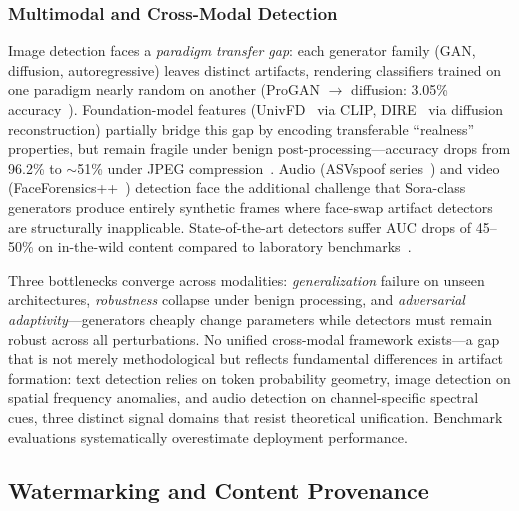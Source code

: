 \subsubsection{Multimodal and Cross-Modal Detection}
\label{sec:detect-multimodal}

Image detection faces a \emph{paradigm transfer gap}: each generator family (GAN, diffusion, autoregressive) leaves distinct artifacts, rendering classifiers trained on one paradigm nearly random on another (ProGAN $\to$ diffusion: 3.05\% accuracy~\cite{ojha2023univfd}). Foundation-model features (UnivFD~\cite{ojha2023univfd} via CLIP, DIRE~\cite{wang2023dire} via diffusion reconstruction) partially bridge this gap by encoding transferable ``realness'' properties, but remain fragile under benign post-processing---accuracy drops from 96.2\% to $\sim$51\% under JPEG compression~\cite{zhu2023genimage}. Audio (ASVspoof series~\cite{asvspoof2019,asvspoof2021}) and video (FaceForensics++~\cite{rossler2019faceforensics}) detection face the additional challenge that Sora-class generators produce entirely synthetic frames where face-swap artifact detectors are structurally inapplicable. State-of-the-art detectors suffer AUC drops of 45--50\% on in-the-wild content compared to laboratory benchmarks~\cite{chandra2025deepfakeeval}.

Three bottlenecks converge across modalities: \emph{generalization} failure on unseen architectures, \emph{robustness} collapse under benign processing, and \emph{adversarial adaptivity}---generators cheaply change parameters while detectors must remain robust across all perturbations. No unified cross-modal framework exists---a gap that is not merely methodological but reflects fundamental differences in artifact formation: text detection relies on token probability geometry, image detection on spatial frequency anomalies, and audio detection on channel-specific spectral cues, three distinct signal domains that resist theoretical unification. Benchmark evaluations systematically overestimate deployment performance.




\subsection{Watermarking and Content Provenance}
\label{sec:watermark}

